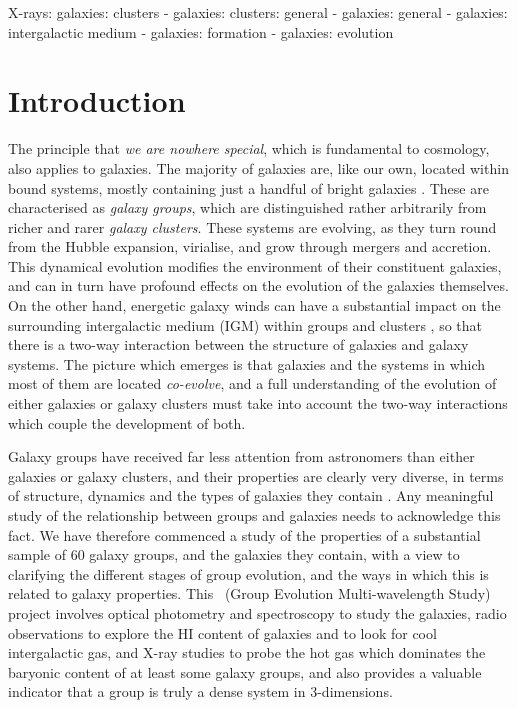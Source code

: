 \documentclass[usenatbib]{mn2e}
\begin{document}

\begin{keywords}
X-rays: galaxies: clusters -
galaxies: clusters: general -
galaxies: general -
galaxies: intergalactic medium -
galaxies: formation -
galaxies: evolution
\end{keywords}

\clearpage


\section{Introduction}
\label{sec_intro}

The principle that {\it we are nowhere special}, which is fundamental to
cosmology, also applies to galaxies.  The majority of galaxies are, like our own,
located within bound systems, mostly containing just a handful of bright galaxies
\citep{tully87}. These are characterised as {\it galaxy groups}, which are
distinguished rather arbitrarily from richer and rarer {\it galaxy clusters}.
These systems are evolving, as they turn round from the Hubble expansion,
virialise, and grow through mergers and accretion.  This dynamical evolution
modifies the environment of their constituent galaxies, and can in turn have
profound effects on the evolution of the galaxies themselves. On the other hand,
energetic galaxy winds can have a substantial impact on the surrounding
intergalactic medium (IGM) within groups and clusters \citep*[e.g][]{ponman99}, so
that there is a two-way interaction between the structure of galaxies and galaxy
systems.  The picture which emerges is that galaxies and the systems in which
most of them are located {\it co-evolve}, and a full understanding of the
evolution of either galaxies or galaxy clusters must take into account the
two-way interactions which couple the development of both.

Galaxy groups have received far less attention from astronomers than either
galaxies or galaxy clusters, and their properties are clearly very diverse, in
terms of structure, dynamics and the types of galaxies they contain
\citep{hickson97,zabludoff98,mulchaey00}. Any meaningful study of the
relationship between groups and galaxies needs to acknowledge this fact. We have
therefore commenced a study of the properties of a substantial sample of 60
galaxy groups, and the galaxies they contain, with a view to clarifying the
different stages of group evolution, and the ways in which this is related to
galaxy properties. This \GEMS\ (Group Evolution Multi-wavelength Study) project
involves optical photometry and spectroscopy to study the galaxies, radio
observations to explore the HI content of galaxies and to look for cool
intergalactic gas, and X-ray studies to probe the hot gas which dominates the
baryonic content of at least some galaxy groups, and also provides a valuable
indicator that a group is truly a dense system in 3-dimensions.
\end{document}
